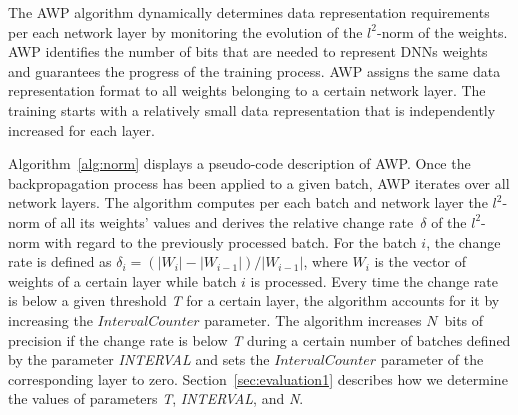 The AWP algorithm dynamically  
determines data representation requirements per each network layer by monitoring the 
evolution of the $l^2$-norm of the weights.
AWP identifies the number of bits that are needed to represent 
DNNs weights and guarantees the progress of the training process.
AWP assigns the same data representation format to all weights 
belonging to a certain network layer.
The training starts with a relatively small data representation that is independently 
increased for each layer. 
%

Algorithm~\ref{alg:norm} displays a pseudo-code description of AWP.
Once the backpropagation process has been applied to a given batch, AWP iterates over all network layers.
The algorithm computes per each batch and network layer the $l^2$-norm of all its weights' values 
and derives the relative change rate~$\delta$ of the $l^2$-norm 
with regard to the previously processed batch. 
For the batch $i$, the change rate is defined as  
$\delta_i=(|W_i| - |W_{i-1}|)/|W_{i-1}|$, where $W_i$ is the vector of weights 
of a certain layer while batch $i$ is processed. 
Every time the change rate is below a given threshold \textit{T} for a certain 
layer, the algorithm accounts for it by increasing the $IntervalCounter$ parameter.
The algorithm increases $N$~bits of precision if the change 
rate is below \textit{T} during a certain number of batches defined by the parameter
\textit{INTERVAL} 
and sets the $IntervalCounter$ parameter of the corresponding layer to zero.
Section~\ref{sec:evaluation1} describes how we determine the values of parameters \textit{T}, \textit{INTERVAL}, and \textit{N}.
